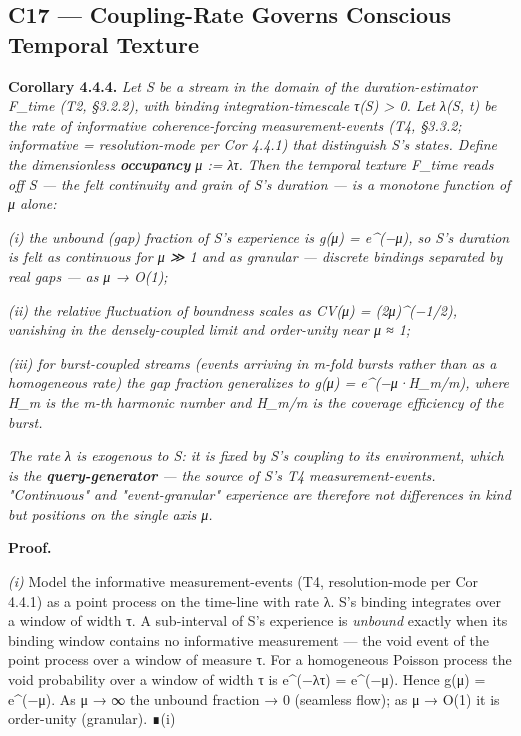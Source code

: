 \documentclass[11pt, openany]{book}
\newcommand{\sectionbreak}{\clearpage}
\begin{document}
\sectionbreak

\subsection{C17 --- Coupling-Rate Governs Conscious Temporal Texture}

\textbf{Corollary 4.4.4.} \textit{Let S be a stream in the domain of the duration-estimator F\_\allowbreak{}time (T2, §3.2.2), with binding integration-timescale τ(S) > 0. Let λ(S, t) be the rate of informative coherence-forcing measurement-events (T4, §3.3.2; informative = resolution-mode per Cor 4.4.1) that distinguish S's states. Define the dimensionless \textbf{occupancy} μ := λτ. Then the temporal texture F\_\allowbreak{}time reads off S --- the felt continuity and grain of S's duration --- is a monotone function of μ alone:}

\textit{(i) the unbound (gap) fraction of S's experience is g(μ) = e\textasciicircum{}(−μ), so S's duration is felt as continuous for μ ≫ 1 and as granular --- discrete bindings separated by real gaps --- as μ → O(1);}

\textit{(ii) the relative fluctuation of boundness scales as CV(μ) = (2μ)\textasciicircum{}(−1/2), vanishing in the densely-coupled limit and order-unity near μ ≈ 1;}

\textit{(iii) for burst-coupled streams (events arriving in m-fold bursts rather than as a homogeneous rate) the gap fraction generalizes to g(μ) = e\textasciicircum{}(−μ·H\_\allowbreak{}m/m), where H\_\allowbreak{}m is the m-th harmonic number and H\_\allowbreak{}m/m is the coverage efficiency of the burst.}

\textit{The rate λ is exogenous to S: it is fixed by S's coupling to its environment, which is the \textbf{query-generator} --- the source of S's T4 measurement-events. "Continuous" and "event-granular" experience are therefore not differences in kind but positions on the single axis μ.}

\textbf{Proof.}

\textit{(i)} Model the informative measurement-events (T4, resolution-mode per Cor 4.4.1) as a point process on the time-line with rate λ. S's binding integrates over a window of width τ. A sub-interval of S's experience is \textit{unbound} exactly when its binding window contains no informative measurement --- the void event of the point process over a window of measure τ. For a homogeneous Poisson process the void probability over a window of width τ is e\textasciicircum{}(−λτ) = e\textasciicircum{}(−μ). Hence g(μ) = e\textasciicircum{}(−μ). As μ → ∞ the unbound fraction → 0 (seamless flow); as μ → O(1) it is order-unity (granular). ∎(i)
\end{document}
